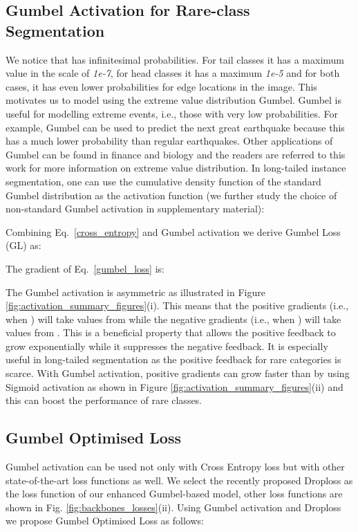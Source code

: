 \documentclass[runningheads]{llncs}
\begin{document}
\subsection{Gumbel Activation for Rare-class Segmentation}
\label{gumbel_methodology}
We notice that  has infinitesimal probabilities. For tail classes it has a maximum value in the scale of \textit{1e-7}, for head classes it has a maximum \textit{1e-5} and for both cases, it has even lower probabilities for edge locations in the image. This motivates us to model  using the extreme value distribution Gumbel. Gumbel is useful for modelling extreme events, i.e., those with very low probabilities. For example, Gumbel can be used to predict the next great earthquake because this has a much lower probability than regular earthquakes. Other applications of Gumbel can be found in finance and biology and the readers are referred to this work \cite{kotz2000extreme} for more information on extreme value distribution. In long-tailed  instance segmentation, one can use the cumulative density function of the standard Gumbel distribution as the activation function (we further study the choice of non-standard Gumbel activation in supplementary material):

Combining Eq.~\ref{cross_entropy} and Gumbel activation we derive Gumbel Loss (GL) as:


\noindent The gradient of Eq.~\ref{gumbel_loss} is:

The Gumbel activation is asymmetric as illustrated in Figure \ref{fig:activation_summary_figures}(i). This means that the positive gradients (i.e.,  when ) will take values from  while the negative gradients (i.e.,  when ) will take values from . This is a beneficial property that allows the positive feedback to grow exponentially while it suppresses the negative feedback. It is especially useful in long-tailed segmentation as the positive feedback for rare categories is scarce. With Gumbel activation, positive gradients can grow faster than by using Sigmoid activation as shown in Figure \ref{fig:activation_summary_figures}(ii) and this can boost the performance of rare classes.

\subsection{Gumbel Optimised Loss}
Gumbel activation can be used not only with Cross Entropy loss but with other state-of-the-art loss functions as well. We select the recently proposed Droploss \cite{hsieh2021droploss} as the loss function of our enhanced Gumbel-based model, other loss functions are shown in Fig. \ref{fig:backbones_losses}(ii). Using Gumbel activation and Droploss we propose Gumbel Optimised Loss  as follows:
\end{document}
